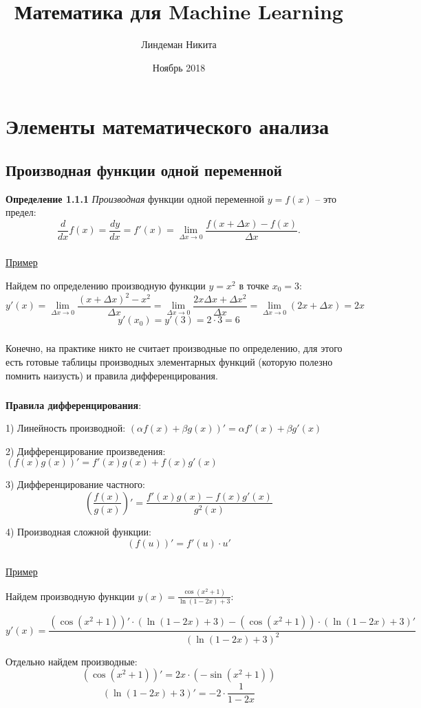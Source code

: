 \documentclass[12pt,a4paper]{article}
\date{Ноябрь 2018}
\author{Линдеман Никита}
\title{Математика для Machine Learning}
\begin{document}
\maketitle
\tableofcontents
\newpage

\section{Элементы математического анализа}
\subsection{Производная функции одной переменной}
\textbf{Определение 1.1.1} 
\textit{Производная} функции одной переменной $y = f(x)$ -- это предел:
\[ \frac{d}{dx}f(x) = \frac{dy}{dx} = f'(x) = \lim_{\Delta x \to 0} \frac{f(x + \Delta x) - f(x)}{\Delta x}. \]

\subparagraph{}
\underline{Пример}

Найдем по определению производную функции $y = x^2$ в точке $x_0 = 3$:
\[ y'(x) = \lim_{\Delta x \to 0} \frac{(x + \Delta x)^2 - x^2}{\Delta x} = \lim_{\Delta x \to 0} \frac{2x\Delta x + \Delta x^2}{\Delta x} = \lim_{\Delta x \to 0} (2x + \Delta x) = 2x\]
\[y'(x_0) = y'(3) = 2 \cdot 3 = 6\]

\subparagraph{}
Конечно, на практике никто не считает производные по определению, для этого есть готовые таблицы производных элементарных функций (которую полезно помнить наизусть) и правила дифференцирования.

\subparagraph{}
\textbf{Правила дифференцирования}:

1) Линейность производной: $(\alpha f(x) + \beta g(x))' = \alpha f'(x) + \beta g'(x)$

2) Дифференцирование произведения: $(f(x)g(x))' = f'(x)g(x) + f(x)g'(x)$


3) Дифференцирование частного: \[ \left(\frac{f(x)}{g(x)}\right)' = \frac{f'(x)g(x) - f(x)g'(x)}{g^2(x)} \]

4) Производная сложной функции: \[ (f(u))' = f'(u) \cdot u'\]

\subparagraph{}
\underline{Пример}

Найдем производную функции $ y(x) = \frac{\cos(x^2 + 1)}{\ln(1-2x) + 3} $:

\[ y'(x) = \frac{(\cos(x^2 + 1))' \cdot (\ln(1-2x) + 3) - (\cos(x^2 + 1)) \cdot (\ln(1-2x) + 3)'}{(\ln(1-2x) + 3)^2} \]

Отдельно найдем производные:
\[ (\cos(x^2 + 1))' = 2x \cdot (-\sin(x^2 + 1))\]
\[ (\ln(1-2x) + 3)' = -2 \cdot \frac{1}{1 - 2x}\]
\end{document}
